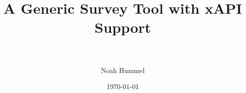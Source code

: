     \lhead{} %
    \rhead{}

    \title{A Generic Survey Tool with xAPI Support \\ \\ }
    \date{\today}
    \author{Noah Hummel}
    

    \newcommand{\addstretch}[1]{\addtolength{#1}{\fill}}
    \newenvironment{onepage}
      {\newpage\flushbottom
       \addstretch{\baselineskip}
       \addstretch{\abovedisplayskip}
       \addstretch{\abovedisplayshortskip}
       \addstretch{\belowdisplayskip}
       \addstretch{\belowdisplayshortskip}
       \setlength{\parskip}{0pt}}
      {\newpage}

    \DeclarePairedDelimiter\abs{\lvert}{\rvert}

    \newcommand{\profhd}{Prof. H. Drachsler }

    \def\inline{\lstinline[basicstyle=\ttfamily,keywordstyle={}]}

    \newcommand{\zcomp}{\underline{Z}}
    \newcommand{\cmp}[1]{\underline{#1}}
